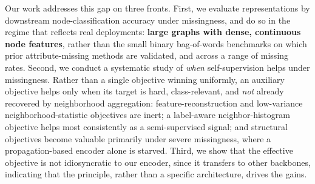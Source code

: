 Our work addresses this gap on three fronts. First, we evaluate representations by downstream node-classification accuracy under missingness, and do so in the regime that reflects real deployments: \textbf{large graphs with dense, continuous node features}, rather than the small binary bag-of-words benchmarks on which prior attribute-missing methods are validated, and across a range of missing rates. Second, we conduct a systematic study of \emph{when} self-supervision helps under missingness. Rather than a single objective winning uniformly, an auxiliary objective helps only when its target is hard, class-relevant, and \emph{not} already recovered by neighborhood aggregation: feature-reconstruction and low-variance neighborhood-statistic objectives are inert; a label-aware neighbor-histogram objective helps most consistently as a semi-supervised signal; and structural objectives become valuable primarily under severe missingness, where a propagation-based encoder alone is starved. Third, we show that the effective objective is not idiosyncratic to our encoder, since it transfers to other backbones, indicating that the principle, rather than a specific architecture, drives the gains.




